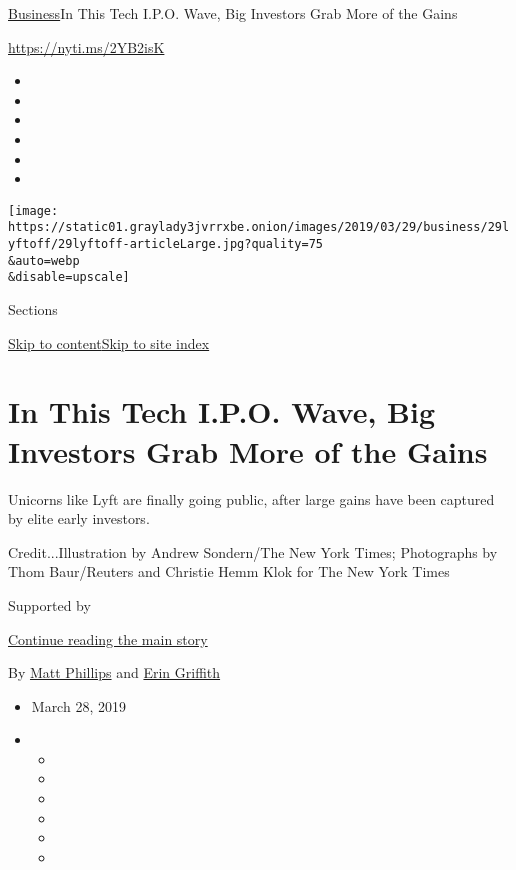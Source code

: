 \href{/section/business}{Business}\textbar{}In This Tech I.P.O. Wave,
Big Investors Grab More of the Gains

\url{https://nyti.ms/2YB2isK}

\begin{itemize}
\item
\item
\item
\item
\item
\item
\end{itemize}

\texttt{[image: https://static01.graylady3jvrrxbe.onion/images/2019/03/29/business/29lyftoff/29lyftoff-articleLarge.jpg?quality=75\\\&auto=webp\\\&disable=upscale]}

Sections

\protect\hyperlink{site-content}{Skip to
content}\protect\hyperlink{site-index}{Skip to site index}

\hypertarget{in-this-tech-ipo-wave-big-investors-grab-more-of-the-gains}{%
\section{In This Tech I.P.O. Wave, Big Investors Grab More of the
Gains}\label{in-this-tech-ipo-wave-big-investors-grab-more-of-the-gains}}

Unicorns like Lyft are finally going public, after large gains have been
captured by elite early investors.

Credit...Illustration by Andrew Sondern/The New York Times; Photographs
by Thom Baur/Reuters and Christie Hemm Klok for The New York Times

Supported by

\protect\hyperlink{after-sponsor}{Continue reading the main story}

By \href{https://www.nytimes3xbfgragh.onion/by/matt-phillips}{Matt
Phillips} and
\href{https://www.nytimes3xbfgragh.onion/by/erin-griffith}{Erin
Griffith}

\begin{itemize}
\item
  March 28, 2019
\item
  \begin{itemize}
  \item
  \item
  \item
  \item
  \item
  \item
  \end{itemize}
\end{itemize}

